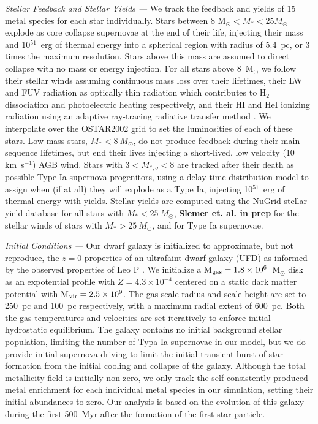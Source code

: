 \documentclass[twocolumn]{aastex61}
\begin{document}
\textit{Stellar Feedback and Stellar Yields ---} We track the feedback and yields of 15 metal species for each star individually. Stars between 8 M$_{\odot} < M_{*} < 25 M_{\odot}$ explode as core collapse supernovae at the end of their life, injecting their mass and 10$^{51}$~erg of thermal energy into a spherical region with radius of 5.4~pc, or 3 times the maximum resolution. Stars above this mass are assumed to direct collapse with no mass or energy injection. For all stars above 8~M$_{\odot}$ we follow their stellar winds assuming continuous mass loss over their lifetimes, their LW and FUV radiation as optically thin radiation which contributes to H$_2$ dissociation and photoelectric heating respectively, and their HI and HeI ionizing radiation using an adaptive ray-tracing radiative transfer method \citep{WiseAbel2011}. We interpolate over the OSTAR2002 \citep{Lanz2003} grid to set the luminosities of each of these stars. Low mass stars, $M_{*} < 8~M_{\odot}$, do not produce feedback during their main sequence lifetimes, but end their lives injecting a short-lived, low velocity (10 km~s$^{-1}$) AGB wind. Stars with $3 < M_{*,o} < 8$ are tracked after their death as possible Type Ia supernova progenitors, using a delay time distribution model to assign when (if at all) they will explode as a Type Ia, injecting 10$^{51}$~erg of thermal energy with yields. Stellar yields are computed using the NuGrid stellar yield database \citep{Ritter2017} for all stars with $M_{*} < 25~M_{\odot}$, \textbf{Slemer et. al. in prep} for the stellar winds of stars with $M_{*} > 25~M_{\odot}$, and \cite{Thielemann1986} for Type Ia supernovae.

\textit{Initial Conditions ---} Our dwarf galaxy is initialized to approximate, but not reproduce, the $z = 0$ properties of an ultrafaint dwarf galaxy (UFD) as informed by the observed properties of Leo P \citep[see ][]{Giovanelli2013,McQuinn2015a,McQuinn2015}. We initialize a M$_{\rm gas} = 1.8 \times 10^{6}$~M$_{\odot}$ disk as an expotential profile with $Z = 4.3 \times 10^{-4}$ centered on a static \cite{Burkert1995} dark matter potential with M$_{\rm vir} = 2.5 \times 10^{9}$. The gas scale radius and scale height are set to 250~pc and 100~pc respectively, with a maximum radial extent of 600~pc. Both the gas temperatures and velocities are set iteratively to enforce initial hydrostatic equilibrium. The galaxy contains no initial background stellar population, limiting the number of Typa Ia supernovae in our model, but we do provide initial supernova driving to limit the initial transient burst of star formation from the initial cooling and collapse of the galaxy. Although the total metallicity field is initially non-zero, we only track the self-consistently produced metal enrichment for each individual metal species in our simulation, setting their initial abundances to zero. Our analysis is based on the evolution of this galaxy during the first 500~Myr after the formation of the first star particle.
\end{document}
